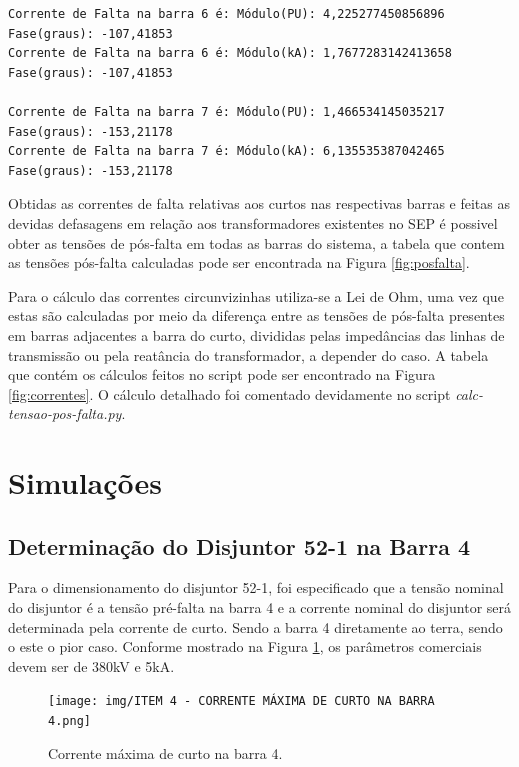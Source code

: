 \documentclass[a4paper, 12pt]{article}
\begin{document}
{\begin{verbatim}
Corrente de Falta na barra 6 é: Módulo(PU): 4,225277450856896 Fase(graus): -107,41853
Corrente de Falta na barra 6 é: Módulo(kA): 1,7677283142413658 Fase(graus): -107,41853

Corrente de Falta na barra 7 é: Módulo(PU): 1,466534145035217 Fase(graus): -153,21178
Corrente de Falta na barra 7 é: Módulo(kA): 6,135535387042465 Fase(graus): -153,21178
\end{verbatim}

Obtidas as correntes de falta relativas aos curtos nas respectivas barras e feitas as devidas defasagens em relação aos transformadores existentes no SEP é possivel obter as tensões de pós-falta em todas as barras do sistema, a tabela que contem as tensões pós-falta calculadas pode ser encontrada na Figura \ref{fig:posfalta}.
    
Para o cálculo das correntes circunvizinhas utiliza-se a Lei de Ohm, uma vez que estas são calculadas por meio da diferença entre as tensões de pós-falta presentes em barras adjacentes a barra do curto, divididas pelas impedâncias das linhas de transmissão ou pela reatância do transformador, a depender do caso. A tabela que contém os cálculos feitos no script pode ser encontrado na Figura \ref{fig:correntes}. O cálculo detalhado foi comentado devidamente no script \textit{calc-tensao-pos-falta.py}.

\section{Simulações}
\subsection{Determinação do Disjuntor 52-1 na Barra 4}
Para o dimensionamento do disjuntor 52-1, foi especificado que a tensão nominal do disjuntor é a tensão pré-falta na barra 4 e a corrente nominal do disjuntor será determinada pela corrente de curto. Sendo a barra 4 diretamente ao terra, sendo o este o pior caso. Conforme mostrado na Figura \ref{fig:item4}, os parâmetros comerciais devem ser de 380kV e 5kA.

\begin{figure}[h]
\centering
  \texttt{[image: img/ITEM 4 - CORRENTE MÁXIMA DE CURTO NA BARRA 4.png]}
\caption{Corrente máxima de curto na barra 4.}
\label{fig:item4}
\end{figure}

}
\end{document}
